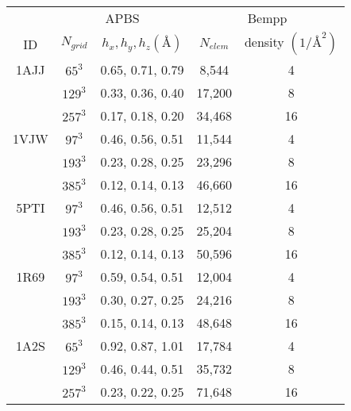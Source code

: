 \documentclass[12pt]{article}
\begin{document}
\begin{table}[]
  \centering
  \begin{tabular}{c|cc|cc}
       & \multicolumn{2}{c|}{APBS}                     & \multicolumn{2}{c}{Bempp}                   \\
  ID   & $N_{grid}$ & $h_x, h_y, h_z (\si{\angstrom})$ & $N_{elem}$ & density $(1/\si{\angstrom}^2)$ \\ \hline
  1AJJ & $65^3$     & 0.65, 0.71, 0.79                 & 8,544      & 4                              \\
       & $129^3$    & 0.33, 0.36, 0.40                 & 17,200     & 8                              \\
       & $257^3$    & 0.17, 0.18, 0.20                 & 34,468     & 16                             \\ \hline
  1VJW & $97^3$     & 0.46, 0.56, 0.51                 & 11,544     & 4                              \\
       & $193^3$    & 0.23, 0.28, 0.25                 & 23,296     & 8                              \\
       & $385^3$    & 0.12, 0.14, 0.13                 & 46,660     & 16                             \\ \hline
  5PTI & $97^3$     & 0.46, 0.56, 0.51                 & 12,512     & 4                              \\
       & $193^3$    & 0.23, 0.28, 0.25                 & 25,204     & 8                              \\
       & $385^3$    & 0.12, 0.14, 0.13                 & 50,596     & 16                             \\ \hline
  1R69 & $97^3$     & 0.59, 0.54, 0.51                 & 12,004     & 4                              \\
       & $193^3$    & 0.30, 0.27, 0.25                 & 24,216     & 8                              \\
       & $385^3$    & 0.15, 0.14, 0.13                 & 48,648     & 16                             \\ \hline
  1A2S & $65^3$     & 0.92, 0.87, 1.01                 & 17,784     & 4                              \\
       & $129^3$    & 0.46, 0.44, 0.51                 & 35,732     & 8                              \\
       & $257^3$    & 0.23, 0.22, 0.25                 & 71,648     & 16                             \\ \hline

\end{tabular}
\end{table}
\end{document}
